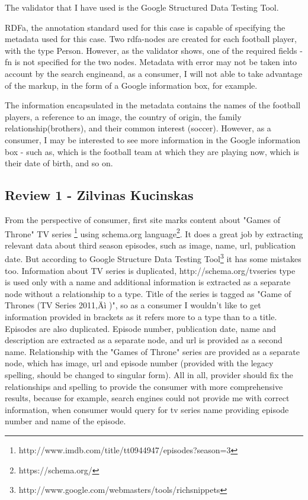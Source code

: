 \documentclass{acm_proc_10ptArticle-sp}
\begin{document}
The validator that I have used is the Google Structured Data Testing Tool. 

RDFa, the annotation standard used for this case is capable of specifying the metadata used for this case. Two rdfa-nodes are created for each football player, with the type Person. However, as the validator shows, one of the required fields - fn is not specified for the two nodes. Metadata with error may not be taken into account by the search engineand, as a consumer, I will not able to take advantage of the markup, in the form of a Google information box, for example.  

The information encapsulated in the metadata contains the names of the football players, a reference to an image, the country of origin, the family relationship(brothers), and their common interest (soccer). However, as a consumer, I may be interested to see more information in the Google information box - such as, which is the football team at which they are playing now, which is their date of birth, and so on. 

\subsection{Review 1 - Zilvinas Kucinskas}
From the perspective of consumer, first site marks content about "Games of Throne" TV series \footnote{http://www.imdb.com/title/tt0944947/episodes?season=3} using schema.org language\footnote{https://schema.org/}. It does a great job by extracting relevant data about third season episodes, such as image, name, url, publication date. But according to Google Structure Data Testing Tool\footnote{http://www.google.com/webmasters/tools/richsnippets} it has some mistakes too. Information about TV series is duplicated, http://schema.org/tvseries type is used only with a name and additional information is extracted as a separate node without a relationship to a type. Title of the series is tagged as "Game of Thrones (TV Series 2011‚Äì )", so as a consumer I wouldn't like to get information provided in brackets as it refers more to a type than to a title. Episodes are also duplicated. Episode number, publication date, name and description are extracted as a separate node, and url is provided as a second name. Relationship with the "Games of Throne" series are provided as a separate node, which has image, url and episode number (provided with the legacy spelling, should be changed to singular form). All in all, provider should fix the relationships and spelling to provide the consumer with more comprehensive results, because for example, search engines could not provide me with correct information, when consumer would query for tv series name providing episode number and name of the episode. 
\end{document}
